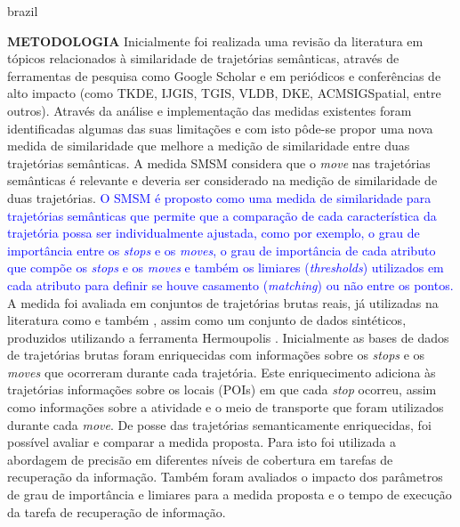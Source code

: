 {\begin{otherlanguage*}{brazil}
\begin{resumo}
        \textbf{METODOLOGIA}
        \newline
        \newline
        Inicialmente foi realizada uma revisão da literatura em tópicos relacionados à similaridade de trajetórias semânticas, através de ferramentas de pesquisa como Google Scholar e em periódicos e conferências de alto impacto (como TKDE, IJGIS, TGIS, VLDB, DKE, ACMSIGSpatial, entre outros). Através da análise e implementação das medidas existentes foram identificadas algumas das suas limitações e com isto pôde-se propor uma nova medida de similaridade que melhore a medição de similaridade entre duas trajetórias semânticas.
        \newline
        A medida SMSM considera que o \emph{move} nas trajetórias semânticas é relevante e deveria ser considerado na medição de similaridade de duas trajetórias. \textcolor{blue}{O SMSM é proposto como uma medida de similaridade para trajetórias semânticas que permite que a comparação de cada característica da trajetória possa ser individualmente ajustada, como por exemplo, o grau de importância entre os \emph{stops} e os \emph{moves}, o grau de importância de cada atributo que compõe os \emph{stops} e os \emph{moves} e também os limiares (\emph{thresholds}) utilizados em cada atributo para definir se houve casamento (\emph{matching}) ou não entre os pontos.}
        \newline
        A medida foi avaliada em conjuntos de trajetórias brutas reais, já utilizadas na literatura como \cite{epfl-mobility-20090224} e também \cite{zheng2009mining}, assim como um conjunto de dados sintéticos, produzidos utilizando a ferramenta Hermoupolis \cite{Pelekis-Hermoupolis}. 
        Inicialmente as bases de dados de trajetórias brutas foram enriquecidas com informações sobre os \emph{stops} e os \emph{moves} que ocorreram durante cada trajetória. Este enriquecimento adiciona às trajetórias informações sobre os locais (POIs) em que cada \emph{stop} ocorreu, assim como informações sobre a atividade e o meio de transporte que foram utilizados durante cada \emph{move}.
        De posse das trajetórias semanticamente enriquecidas, foi possível avaliar e comparar a medida proposta. Para isto foi utilizada a abordagem de precisão em diferentes níveis de cobertura \cite{BaezaYatesRibeiroNeto2011} em tarefas de recuperação da informação. Também foram avaliados o impacto dos parâmetros de grau de importância e limiares para a medida proposta e o tempo de execução da tarefa de recuperação de informação.
        \newline
        \newline
        

\end{resumo}
\end{otherlanguage*}}
